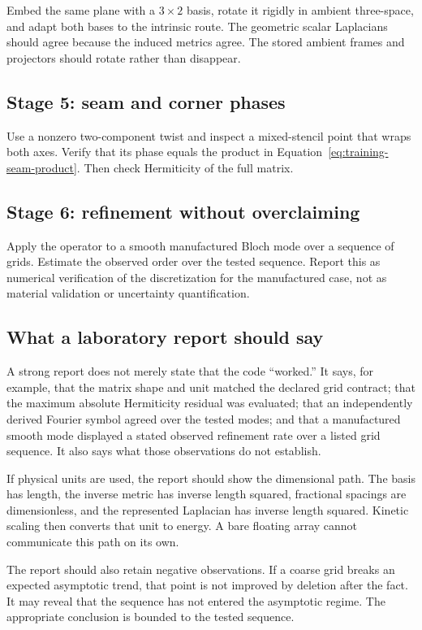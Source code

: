Embed the same plane with a $3\times2$ basis, rotate it rigidly in ambient
three-space, and adapt both bases to the intrinsic route. The geometric scalar
Laplacians should agree because the induced metrics agree. The stored ambient
frames and projectors should rotate rather than disappear.

\subsection{Stage 5: seam and corner phases}

Use a nonzero two-component twist and inspect a mixed-stencil point that wraps
both axes. Verify that its phase equals the product in
Equation~\eqref{eq:training-seam-product}. Then check Hermiticity of the full
matrix.

\subsection{Stage 6: refinement without overclaiming}

Apply the operator to a smooth manufactured Bloch mode over a sequence of
grids. Estimate the observed order over the tested sequence. Report this as
numerical verification of the discretization for the manufactured case, not as
material validation or uncertainty quantification.

\subsection{What a laboratory report should say}

A strong report does not merely state that the code ``worked.'' It says, for
example, that the matrix shape and unit matched the declared grid contract;
that the maximum absolute Hermiticity residual was evaluated; that an
independently derived Fourier symbol agreed over the tested modes; and that a
manufactured smooth mode displayed a stated observed refinement rate over a
listed grid sequence. It also says what those observations do not establish.

If physical units are used, the report should show the dimensional path. The
basis has length, the inverse metric has inverse length squared, fractional
spacings are dimensionless, and the represented Laplacian has inverse length
squared. Kinetic scaling then converts that unit to energy. A bare floating
array cannot communicate this path on its own.

The report should also retain negative observations. If a coarse grid breaks an
expected asymptotic trend, that point is not improved by deletion after the
fact. It may reveal that the sequence has not entered the asymptotic regime.
The appropriate conclusion is bounded to the tested sequence.

